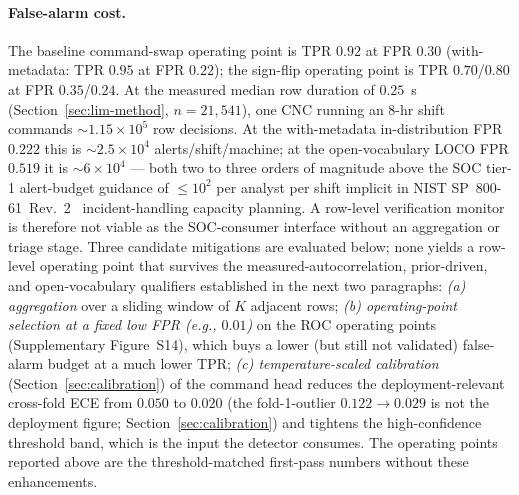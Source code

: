 \documentclass[sensors,article,submit,moreauthors,pdftex]{Definitions/mdpi}
\begin{document}
\paragraph{False-alarm cost.} The baseline command-swap operating point is TPR $0.92$ at FPR $0.30$ (with-metadata: TPR $0.95$ at FPR $0.22$); the sign-flip operating point is TPR $0.70$/$0.80$ at FPR $0.35$/$0.24$. At the measured median row duration of $0.25$~s (Section~\ref{sec:lim-method}, $n\!=\!21{,}541$), one CNC running an 8-hr shift commands $\sim$$1.15\!\times\!10^{5}$ row decisions. At the with-metadata in-distribution FPR $0.222$ this is $\sim$$2.5\!\times\!10^{4}$ alerts/shift/machine; at the open-vocabulary LOCO FPR $0.519$ it is $\sim$$6\!\times\!10^{4}$ --- both two to three orders of magnitude above the SOC tier-1 alert-budget guidance of $\le\!10^{2}$ per analyst per shift implicit in NIST SP~800-61~Rev.~2~\cite{nist2012sp80061} incident-handling capacity planning. A row-level verification monitor is therefore not viable as the SOC-consumer interface without an aggregation or triage stage. Three candidate mitigations are evaluated below; none yields a row-level operating point that survives the measured-autocorrelation, prior-driven, and open-vocabulary qualifiers established in the next two paragraphs: \emph{(a) aggregation} over a sliding window of $K$ adjacent rows; \emph{(b) operating-point selection at a fixed low FPR (e.g., $0.01$)} on the ROC operating points (Supplementary Figure~S14), which buys a lower (but still not validated) false-alarm budget at a much lower TPR; \emph{(c) temperature-scaled calibration} (Section~\ref{sec:calibration}) of the command head reduces the deployment-relevant cross-fold ECE from $0.050$ to $0.020$ (the fold-1-outlier $0.122 \to 0.029$ is not the deployment figure; Section~\ref{sec:calibration}) and tightens the high-confidence threshold band, which is the input the detector consumes. The operating points reported above are the threshold-matched first-pass numbers without these enhancements.
\end{document}
